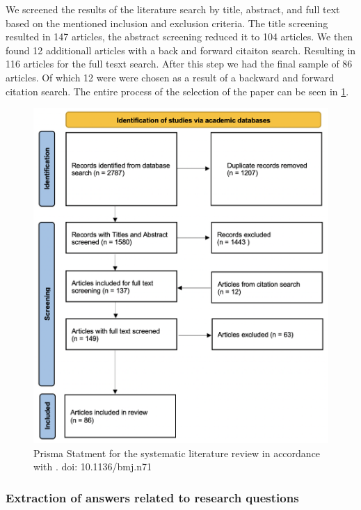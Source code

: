 We screened the results of the literature search by title, abstract, and full text based on the mentioned inclusion and exclusion criteria. The title screening resulted in 147 articles, the abstract screening reduced it to 104 articles. We then found 12 additionall articles with a back and forward citaiton search. Resulting in 116 articles for the full tesxt search. After this step we had the final sample of 86 articles. Of which 12 were  were chosen as a result of a backward and forward citation search. The entire process of the selection of the paper can be seen in \ref{fig: Prisma Statement}.

\begin{figure}
    \centering
    \includegraphics[width=\textwidth]{reports/figures/Prisma Statement.png}
    \caption{Prisma Statment for the systematic literature review in accordance with \cite{moher_preferred_2009} . doi: 10.1136/bmj.n71}
    \label{fig: Prisma Statement}
\end{figure}

\subsubsection{Extraction of answers related to research questions}

